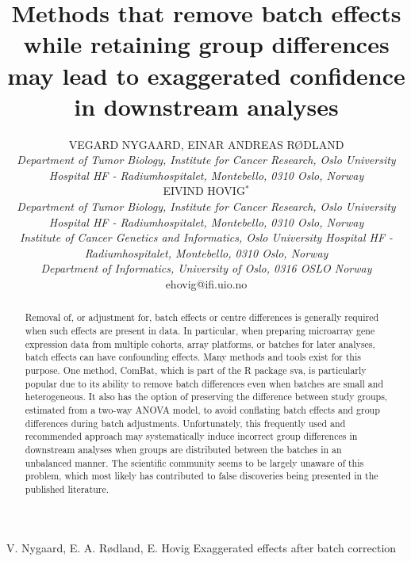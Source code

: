 \documentclass{bio}
\begin{document}

\title{Methods that remove batch effects while retaining group differences may lead
to exaggerated confidence in downstream analyses
}

\author{VEGARD NYGAARD, EINAR ANDREAS RØDLAND\\[4pt]
\textit{Department of Tumor Biology,
Institute for Cancer Research,
Oslo University Hospital HF - Radiumhospitalet,
Montebello,
0310 Oslo,
Norway}
\\[8pt]
EIVIND HOVIG$^\ast$\\[4pt]
\textit{Department of Tumor Biology,
Institute for Cancer Research,
Oslo University Hospital HF - Radiumhospitalet,
Montebello,
0310 Oslo,
Norway}
\\[2pt]
\textit{Institute of Cancer Genetics and Informatics, Oslo University Hospital HF - Radiumhospitalet,
Montebello, 
0310 Oslo,
Norway}
\\[2pt]
\textit{Department of Informatics, University of Oslo, 
0316 OSLO
Norway}
\\[2pt]
{ehovig@ifi.uio.no}}

\markboth%
{V. Nygaard, E. A. Rødland, E. Hovig}
{Exaggerated effects after batch correction}


\maketitle



\begin{abstract}
{Removal of, or adjustment for, batch effects or centre differences is generally required when such effects are present in data. In particular, when preparing microarray gene expression data from multiple cohorts, array platforms, or batches for later analyses, batch effects can have confounding effects. Many methods and tools exist for this purpose. One method, ComBat, which is part of the R package sva, is particularly popular due to its ability to remove batch differences even when batches are small and heterogeneous. It also has the option of preserving the difference between study groups, estimated from a two-way ANOVA model, to avoid conflating batch effects and group differences during batch adjustments. Unfortunately, this frequently used and recommended approach may systematically induce incorrect group differences in downstream analyses when groups are distributed between the batches in an unbalanced manner. The scientific community seems to be largely unaware of this problem, which most likely has contributed to false discoveries being presented in the published literature.
}
\end{abstract}
\end{document}
